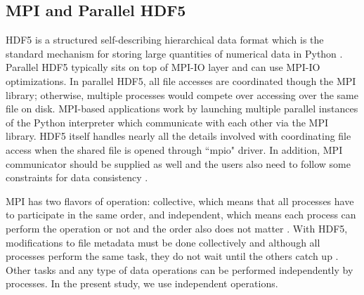 \subsection{MPI and Parallel HDF5}
HDF5 is a structured self-describing hierarchical data format which is the standard mechanism for storing large quantities of numerical data in Python \cite{pythonhdf5, HDF5_url}.
Parallel HDF5 typically sits on top of MPI-IO layer and can use MPI-IO optimizations. 
In parallel HDF5, all file accesses are coordinated though the MPI library; otherwise, multiple processes would compete over accessing over the same file on disk. 
MPI-based applications work by launching multiple parallel instances of the Python interpreter which communicate with each other via the MPI library. 
HDF5 itself handles nearly all the details involved with coordinating file access when the shared file is opened through ``mpio" driver.
In addition, MPI communicator should be supplied as well and the users also need to follow some constraints for data consistency \cite{pythonhdf5}.

MPI has two flavors of operation: collective, which means that all processes have to participate in the same order, and independent, which means each process can perform the operation or not and the order also does not matter  \cite{pythonhdf5}.
With HDF5, modifications to file metadata must be done collectively and although all processes perform the same task, they do not wait until the others catch up \cite{pythonhdf5}. 
Other tasks and any type of data operations can be performed independently by processes.
In the present study, we use independent operations.
